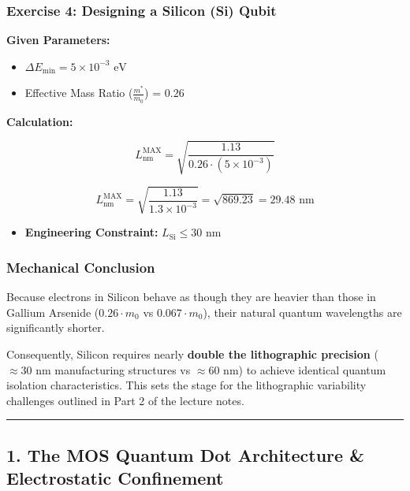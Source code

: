 \documentclass[
]{article}
\providecommand{\tightlist}{%
  \setlength{\itemsep}{0pt}\setlength{\parskip}{0pt}}
\begin{document}
\subsubsection{Exercise 4: Designing a Silicon (Si)
Qubit}\label{exercise-4-designing-a-silicon-si-qubit}

\textbf{Given Parameters:}

\begin{itemize}
\tightlist
\item
  \(\Delta E_{\min} = 5 \times 10^{-3} \text{ eV}\)
\item
  Effective Mass Ratio (\(\frac{m^*}{m_0}\)) = \(0.26\)
\end{itemize}

\textbf{Calculation:}

\[L_{\text{nm}}^{\text{MAX}} = \sqrt{\frac{1.13}{0.26 \cdot (5 \times 10^{-3})}}\]

\[L_{\text{nm}}^{\text{MAX}} = \sqrt{\frac{1.13}{1.3 \times 10^{-3}}} = \sqrt{869.23} = 29.48 \text{ nm}\]

\begin{itemize}
\tightlist
\item
  \textbf{Engineering Constraint:} \(L_{\text{Si}} \le 30 \text{ nm}\)
\end{itemize}

\subsubsection{Mechanical Conclusion}\label{mechanical-conclusion}

Because electrons in Silicon behave as though they are heavier than
those in Gallium Arsenide (\(0.26 \cdot m_0\) vs \(0.067 \cdot m_0\)),
their natural quantum wavelengths are significantly shorter.

Consequently, Silicon requires nearly \textbf{double the lithographic
precision} (\(\approx 30 \text{ nm}\) manufacturing structures vs
\(\approx 60 \text{ nm}\)) to achieve identical quantum isolation
characteristics. This sets the stage for the lithographic variability
challenges outlined in Part 2 of the lecture notes.

\begin{center}\rule{0.5\linewidth}{0.5pt}\end{center}

\subsection{1. The MOS Quantum Dot Architecture \& Electrostatic
Confinement}\label{the-mos-quantum-dot-architecture-electrostatic-confinement}
\end{document}
